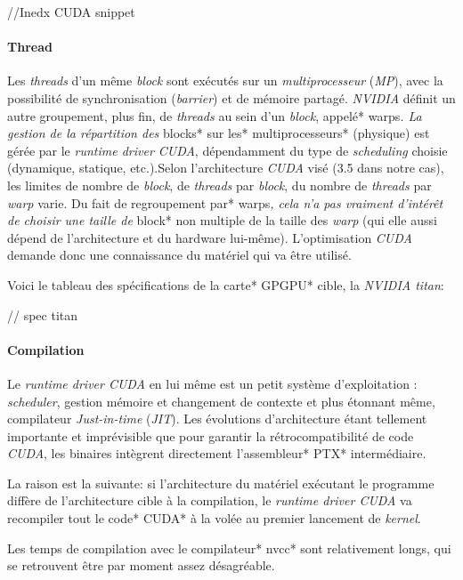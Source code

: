 \documentclass[french, 11pt]{memoir}
\begin{document}
//Inedx CUDA snippet

\paragraph{Thread}\label{thread}

Les \emph{threads} d'un même \emph{block} sont exécutés sur un
\emph{multiprocesseur} (\emph{MP}), avec la possibilité de
synchronisation (\emph{barrier}) et de mémoire partagé. \emph{NVIDIA}
définit un autre groupement, plus fin, de \emph{threads} au sein d'un
\emph{block}, appelé* warps\emph{. La gestion de la répartition des
}blocks* sur les* multiprocesseurs* (physique) est gérée par le
\emph{runtime driver CUDA}, dépendamment du type de \emph{scheduling}
choisie (dynamique, statique, etc.).Selon l'architecture \emph{CUDA}
visé (3.5 dans notre cas), les limites de nombre de \emph{block}, de
\emph{threads} par \emph{block}, du nombre de \emph{threads} par
\emph{warp} varie. Du fait de regroupement par* warps\emph{, cela n'a
	pas vraiment d'intérêt de choisir une taille de }block* non multiple de
la taille des \emph{warp} (qui elle aussi dépend de l'architecture et du
hardware lui-même). L'optimisation \emph{CUDA} demande donc une
connaissance du matériel qui va être utilisé.

Voici le tableau des spécifications de la carte* GPGPU* cible, la
\emph{NVIDIA titan}:

// spec titan

\paragraph{Compilation}\label{compilation}

Le \emph{runtime driver CUDA} en lui même est un petit système
d'exploitation : \emph{scheduler}, gestion mémoire et changement de
contexte et plus étonnant même, compilateur \emph{Just-in-time}
(\emph{JIT}). Les évolutions d'architecture étant tellement importante
et imprévisible que pour garantir la rétrocompatibilité de code
\emph{CUDA}, les binaires intègrent directement l'assembleur* PTX*
intermédiaire.

La raison est la suivante: si l'architecture du matériel exécutant le
programme diffère de l'architecture cible à la compilation, le
\emph{runtime driver CUDA} va recompiler tout le code* CUDA* à la volée
au premier lancement de \emph{kernel}.

Les temps de compilation avec le compilateur* nvcc* sont relativement
longs, qui se retrouvent être par moment assez désagréable.
\end{document}
